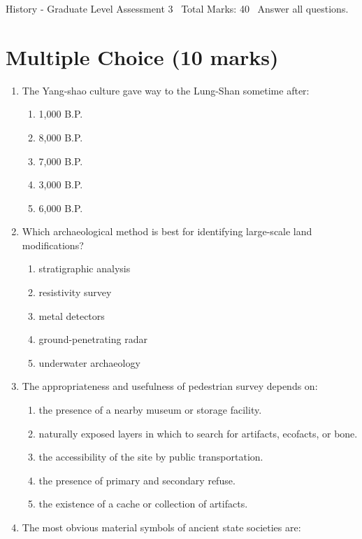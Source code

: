 \documentclass[12pt]{article}
\begin{document}
\begin{center}
History - Graduate Level Assessment 3 \
Total Marks: 40 \
Answer all questions.
\end{center}

\section*{Multiple Choice (10 marks)}
\begin{enumerate}[label=\arabic*.]
\item The Yang-shao culture gave way to the Lung-Shan sometime after:
\begin{enumerate}[label=(\alph*)]
    \item 1,000 B.P.
    \item 8,000 B.P.
    \item 7,000 B.P.
    \item 3,000 B.P.
    \item 6,000 B.P.
\end{enumerate}
\item Which archaeological method is best for identifying large-scale land modifications?
\begin{enumerate}[label=(\alph*)]
    \item stratigraphic analysis
    \item resistivity survey
    \item metal detectors
    \item ground-penetrating radar
    \item underwater archaeology
\end{enumerate}
\item The appropriateness and usefulness of pedestrian survey depends on:
\begin{enumerate}[label=(\alph*)]
    \item the presence of a nearby museum or storage facility.
    \item naturally exposed layers in which to search for artifacts, ecofacts, or bone.
    \item the accessibility of the site by public transportation.
    \item the presence of primary and secondary refuse.
    \item the existence of a cache or collection of artifacts.
\end{enumerate}
\item The most obvious material symbols of ancient state societies are:
\begin{enumerate}[label=(\alph*)]

\end{enumerate}
\end{enumerate}
\end{document}
